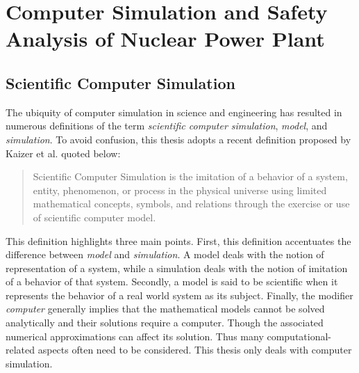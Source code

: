 \section{Computer Simulation and Safety Analysis of Nuclear Power Plant}\label{sec:intro_computer_simulation}

\subsection{Scientific Computer Simulation}\label{sub:intro_scientific_computer_simulation}

The ubiquity of computer simulation in science and engineering has resulted in numerous definitions of the term \textit{scientific computer simulation}, \textit{model}, and \textit{simulation}.
To avoid confusion, this thesis adopts a recent definition proposed by Kaizer et al.\cite{Kaizer2015} quoted below:
\begin{quote}
	Scientific Computer Simulation is the imitation of a behavior of a system, entity, phenomenon, or process in the physical universe 
	using limited mathematical concepts, symbols, and relations through the exercise or use of scientific computer model.
\end{quote}

This definition highlights three main points.
First, this definition accentuates the difference between \emph{model} and \emph{simulation}.
A model deals with the notion of representation of a system, while a simulation deals with the notion of imitation of a behavior of that system.
Secondly, a model is said to be scientific when it represents the behavior of a real world system as its subject.
Finally, the modifier \emph{computer} generally implies that the mathematical models cannot be solved analytically and their solutions require a computer.
Though the associated numerical approximations can affect its solution. 
Thus many computational-related aspects often need to be considered.
This thesis only deals with computer simulation.

